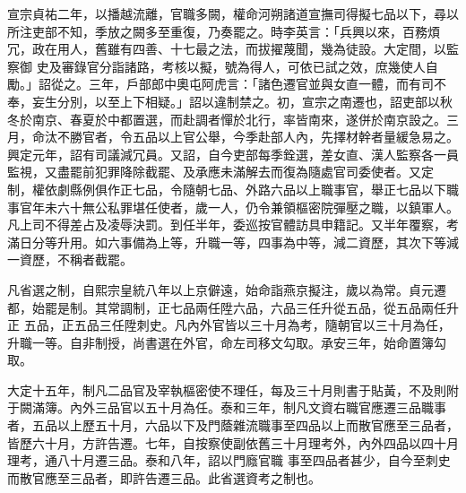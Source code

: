 \begin{pinyinscope}
 宣宗貞祐二年，以播越流離，官職多闕，權命河朔諸道宣撫司得擬七品以下，尋以所注吏部不知，季放之闕多至重復，乃奏罷之。時李英言：「兵興以來，百務煩冗，政在用人，舊雖有四善、十七最之法，而拔擢蔑聞，幾為徒設。大定間，以監察御
 史及審錄官分詣諸路，考核以擬，號為得人，可依已試之效，庶幾使人自勵。」詔從之。三年，戶部郎中奧屯阿虎言：「諸色遷官並與女直一體，而有司不奉，妄生分別，以至上下相疑。」詔以違制禁之。初，宣宗之南遷也，詔吏部以秋冬於南京、春夏於中都置選，而赴調者憚於北行，率皆南來，遂併於南京設之。三月，命汰不勝官者，令五品以上官公舉，今季赴部人內，先擇材幹者量緩急易之。興定元年，詔有司議減冗員。又詔，自今吏部每季銓選，差女直、漢人監察各一員監視，又盡罷前犯罪降除截罷、及承應未滿解去而復為隨處官司委使者。又定
 制，權依劇縣例俱作正七品，令隨朝七品、外路六品以上職事官，舉正七品以下職事官年未六十無公私罪堪任使者，歲一人，仍令兼領樞密院彈壓之職，以鎮軍人。凡上司不得差占及凌辱決罰。到任半年，委巡按官體訪具申籍記。又半年覆察，考滿日分等升用。如六事備為上等，升職一等，四事為中等，減二資歷，其次下等減一資歷，不稱者截罷。



 凡省選之制，自熙宗皇統八年以上京僻遠，始命詣燕京擬注，歲以為常。貞元遷都，始罷是制。其常調制，正七品兩任陞六品，六品三任升從五品，從五品兩任升正
 五品，正五品三任陞刺史。凡內外官皆以三十月為考，隨朝官以三十月為任，升職一等。自非制授，尚書選在外官，命左司移文勾取。承安三年，始命置簿勾取。



 大定十五年，制凡二品官及宰執樞密使不理任，每及三十月則書于貼黃，不及則附于闕滿簿。內外三品官以五十月為任。泰和三年，制凡文資右職官應遷三品職事者，五品以上歷五十月，六品以下及門蔭雜流職事至四品以上而散官應至三品者，皆歷六十月，方許告遷。七年，自按察使副依舊三十月理考外，內外四品以四十月理考，通八十月遷三品。泰和八年，詔以門廕官職
 事至四品者甚少，自今至刺史而散官應至三品者，即許告遷三品。此省選資考之制也。




\end{pinyinscope}
